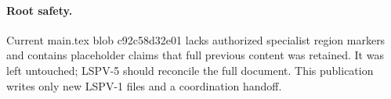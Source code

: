 \documentclass[11pt]{article}
\begin{document}
\paragraph{Root safety.} Current main.tex blob c92c58d32e01 lacks authorized specialist region markers and contains placeholder claims that full previous content was retained. It was left untouched; LSPV-5 should reconcile the full document. This publication writes only new LSPV-1 files and a coordination handoff.
\end{document}
